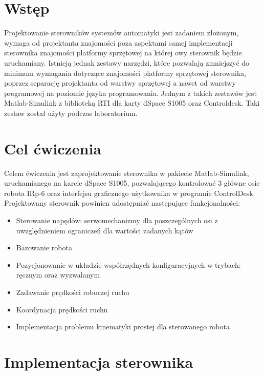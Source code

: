 \documentclass[12pt]{article}
\begin{document}
 
 

\section{Wstęp}

Projektowanie sterowników systemów automatyki jest zadaniem złożonym,
wymaga od projektanta znajomości poza aspektami samej implementacji sterownika
znajomości platformy sprzętowej na której owy sterownik będzie uruchamiany.
Istnieją jednak zestawy narzędzi, które pozwalają zmniejszyć do minimum
wymagania dotyczące znajomości platformy sprzętowej sterownika, poprzez
separację projektanta od warstwy sprzętowej a nawet od warstwy programowej na
poziomie języka programowania. Jednym z takich zestawów jest Matlab-Simulink z
biblioteką RTI dla karty dSpace S1005 oraz Controldesk. Taki zestaw został użyty
podczas laboratorium.

\section{Cel ćwiczenia}

Celem ćwiczenia jest zaprojektowanie sterownika w pakiecie Matlab-Simulink,
uruchamianego na karcie dSpace S1005, pozwalającego kontrolować 3 główne osie
robota IRp-6 oraz interfejsu graficznego użytkownika w programie ControlDesk.
Projektowany sterownik powinien udostępniać następujące funkcjonalności:

\begin{itemize}
  \item Sterowanie napędów: serwomechanizmy dla poszczególnych osi z
  uwzględnieniem ograniczeń dla wartości zadanych kątów
  \item Bazowanie robota
  \item Pozycjonowanie w układzie współrzędnych konfiguracyjnych w trybach:
  ręcznym oraz wyzwalanym
  \item Zadawanie prędkości roboczej ruchu
  \item Koordynacja prędkości ruchu
  \item Implementacja problemu kinematyki prostej dla sterowanego robota
\end{itemize}

\newpage

\section{Implementacja sterownika}
\end{document}
